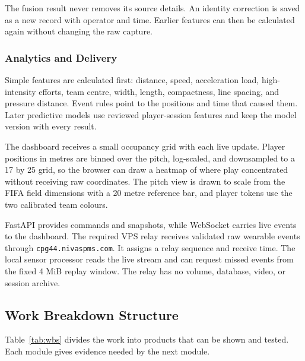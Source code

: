The fusion result never removes its source details. An identity correction is
saved as a new record with operator and time. Earlier features can then be
calculated again without changing the raw capture.

\subsubsection{Analytics and Delivery}
Simple features are calculated first: distance, speed, acceleration load,
high-intensity efforts, team centre, width, length, compactness, line spacing,
and pressure distance. Event rules point to the positions and time that caused
them. Later predictive models use reviewed player-session features and keep the
model version with every result.

The dashboard receives a small occupancy grid with each live update. Player
positions in metres are binned over the pitch, log-scaled, and downsampled to a
17 by 25 grid, so the browser can draw a heatmap of where play concentrated
without receiving raw coordinates. The pitch view is drawn to scale from the
FIFA field dimensions with a 20 metre reference bar, and player tokens use the
two calibrated team colours.

FastAPI provides commands and snapshots, while WebSocket carries live events
to the dashboard. The required VPS relay receives validated raw wearable events
through \nolinkurl{cpg44.nivaspms.com}. It assigns a relay sequence and receive
time. The local sensor processor reads the live stream and can request missed
events from the fixed 4 MiB replay window. The relay has no volume, database,
video, or session archive.

\subsection{Work Breakdown Structure}
Table~\ref{tab:wbs} divides the work into products that can be shown and tested.
Each module gives evidence needed by the next module.

